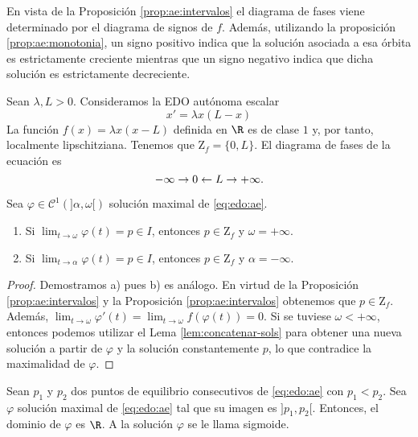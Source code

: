 \documentclass{article}
\begin{document}
En vista de la Proposición \ref{prop:ae:intervalos} el diagrama de fases viene determinado por el
diagrama de signos de $f$. Además, utilizando la proposición \ref{prop:ae:monotonia}, un signo
positivo indica que la solución asociada a esa órbita es estrictamente creciente mientras que un
signo negativo indica que dicha solución es estrictamente decreciente.

\begin{ex} \label{ex:logistica} Sean $\lambda, L > 0$. Consideramos la EDO
  autónoma escalar
  \begin{equation}
    \label{eq:log}
    x' = \lambda x(L-x)
  \end{equation}
  La función $f(x) = \lambda x (x -L)$ definida en $\R$ es de clase $1$ y, por tanto, localmente
  lipschitziana. Tenemos que $\mathrm{Z}_f = \{0, L\}$. El diagrama de fases de la ecuación es
  \[-\infty \rightarrow 0 \leftarrow L \rightarrow +\infty. \qedhere\]
\end{ex}

\begin{cor}
  Sea $\varphi \in \mathcal{C}^1(]\alpha, \omega[)$ solución maximal de \eqref{eq:edo:ae}.
  \begin{enumerate}
  \item Si $\lim_{t \to \omega} \varphi(t) = p \in I$, entonces $p \in \mathrm{Z}_f$ y
    $\omega = +\infty$.
  \item Si $\lim_{t \to \alpha} \varphi(t) = p \in I$, entonces $p \in \mathrm{Z}_f$ y
    $\alpha = -\infty$.
  \end{enumerate}
\end{cor}
\begin{proof}
  Demostramos a) pues b) es análogo. En virtud de la Proposición \ref{prop:ae:intervalos} y la
  Proposición \ref{prop:ae:intervalos} obtenemos que $p \in \mathrm{Z}_f$. Además,
  $\lim_{t \to \omega} \varphi'(t) = \lim_{t \to \omega} f(\varphi(t)) = 0$. Si se tuviese
  $\omega < +\infty$, entonces podemos utilizar el Lema \ref{lem:concatenar-sols} para obtener una
  nueva solución a partir de $\varphi$ y la solución constantemente $p$, lo que contradice la
  maximalidad de $\varphi$.
\end{proof}

\begin{cor}
  Sean $p_1$ y $p_2$ dos puntos de equilibrio consecutivos de \eqref{eq:edo:ae} con $p_1 < p_2$. Sea
  $\varphi$ solución maximal de \eqref{eq:edo:ae} tal que su imagen es $]p_1, p_2[$. Entonces, el
  dominio de $\varphi$ es $\R$. A la solución $\varphi$ se le llama sigmoide.
\end{cor}
\end{document}
